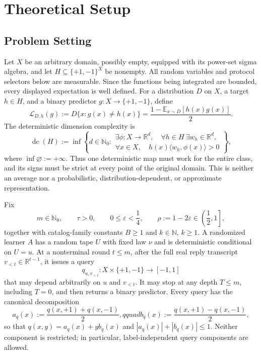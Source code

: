 \section{Theoretical Setup}\label{sec:setup}

\subsection{Problem Setting}

Let $X$ be an arbitrary domain, possibly empty, equipped with its power-set
sigma algebra, and let $H\subseteq\{+1,-1\}^{X}$ be nonempty.  All random
variables and protocol selectors below are measurable.  Since the functions
being integrated are bounded, every displayed expectation is well defined.
For a distribution $D$ on $X$, a target $h\in H$, and a binary predictor
$g:X\to\{+1,-1\}$, define
\begin{equation}\label{eq:loss-definition}
\mathcal L_{D,h}(g)
:=D\{x:g(x)\ne h(x)\}
=\frac{1-\mathbb E_{x\sim D}[h(x)g(x)]}{2}.
\end{equation}
The deterministic dimension complexity is
\begin{equation}\label{eq:dc-definition}
\operatorname{dc}(H):=
\inf\left\{d\in\mathbb N_0:
\begin{array}{l}
\exists\phi:X\to\mathbb R^d,\quad
\forall h\in H\ \exists w_h\in\mathbb R^d,\\[-1mm]
\forall x\in X,\quad h(x)\langle w_h,\phi(x)\rangle>0
\end{array}\right\},
\end{equation}
where $\inf\varnothing:=+\infty$.  Thus one deterministic map must work for
the entire class, and its signs must be strict at every point of the original
domain.  This is neither an average nor a probabilistic,
distribution-dependent, or approximate representation.

Fix
\[
m\in\mathbb N_0,\qquad \tau>0,\qquad
0\le\varepsilon<\frac14,\qquad
\rho:=1-2\varepsilon\in\left(\frac12,1\right],
\]
together with catalog-family constants $B\ge1$ and
$k\in\mathbb N$, $k\ge1$.  A randomized learner $A$ has a random tape
$U$ with fixed law $\nu$ and is deterministic conditional on $U=u$.  At a
nonterminal round $t\le m$, after the full real reply transcript
$v_{<t}\in\mathbb R^{t-1}$, it issues a query
\[
q_{u,v_{<t}}:X\times\{+1,-1\}\longrightarrow[-1,1]
\]
that may depend arbitrarily on $u$ and $v_{<t}$.  It may stop at any depth
$T\le m$, including $T=0$, and then returns a binary predictor.  Every query
has the canonical decomposition
\[
a_q(x):=\frac{q(x,+1)+q(x,-1)}2,qquad
b_q(x):=\frac{q(x,+1)-q(x,-1)}2,
\]
so that $q(x,y)=a_q(x)+yb_q(x)$ and
$|a_q(x)|+|b_q(x)|\le1$.  Neither component is restricted; in particular,
label-independent query components are allowed.

